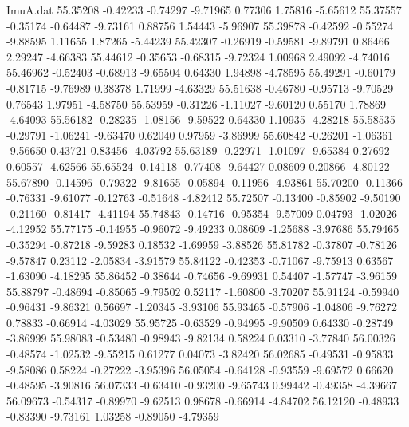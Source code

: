 \begin{filecontents}{ImuA.dat}
  55.35208   -0.42233   -0.74297   -9.71965    0.77306    1.75816   -5.65612
  55.37557   -0.35174   -0.64487   -9.73161    0.88756    1.54443   -5.96907
  55.39878   -0.42592   -0.55274   -9.88595    1.11655    1.87265   -5.44239
  55.42307   -0.26919   -0.59581   -9.89791    0.86466    2.29247   -4.66383
  55.44612   -0.35653   -0.68315   -9.72324    1.00968    2.49092   -4.74016
  55.46962   -0.52403   -0.68913   -9.65504    0.64330    1.94898   -4.78595
  55.49291   -0.60179   -0.81715   -9.76989    0.38378    1.71999   -4.63329
  55.51638   -0.46780   -0.95713   -9.70529    0.76543    1.97951   -4.58750
  55.53959   -0.31226   -1.11027   -9.60120    0.55170    1.78869   -4.64093
  55.56182   -0.28235   -1.08156   -9.59522    0.64330    1.10935   -4.28218
  55.58535   -0.29791   -1.06241   -9.63470    0.62040    0.97959   -3.86999
  55.60842   -0.26201   -1.06361   -9.56650    0.43721    0.83456   -4.03792
  55.63189   -0.22971   -1.01097   -9.65384    0.27692    0.60557   -4.62566
  55.65524   -0.14118   -0.77408   -9.64427    0.08609    0.20866   -4.80122
  55.67890   -0.14596   -0.79322   -9.81655   -0.05894   -0.11956   -4.93861
  55.70200   -0.11366   -0.76331   -9.61077   -0.12763   -0.51648   -4.82412
  55.72507   -0.13400   -0.85902   -9.50190   -0.21160   -0.81417   -4.41194
  55.74843   -0.14716   -0.95354   -9.57009    0.04793   -1.02026   -4.12952
  55.77175   -0.14955   -0.96072   -9.49233    0.08609   -1.25688   -3.97686
  55.79465   -0.35294   -0.87218   -9.59283    0.18532   -1.69959   -3.88526
  55.81782   -0.37807   -0.78126   -9.57847    0.23112   -2.05834   -3.91579
  55.84122   -0.42353   -0.71067   -9.75913    0.63567   -1.63090   -4.18295
  55.86452   -0.38644   -0.74656   -9.69931    0.54407   -1.57747   -3.96159
  55.88797   -0.48694   -0.85065   -9.79502    0.52117   -1.60800   -3.70207
  55.91124   -0.59940   -0.96431   -9.86321    0.56697   -1.20345   -3.93106
  55.93465   -0.57906   -1.04806   -9.76272    0.78833   -0.66914   -4.03029
  55.95725   -0.63529   -0.94995   -9.90509    0.64330   -0.28749   -3.86999
  55.98083   -0.53480   -0.98943   -9.82134    0.58224    0.03310   -3.77840
  56.00326   -0.48574   -1.02532   -9.55215    0.61277    0.04073   -3.82420
  56.02685   -0.49531   -0.95833   -9.58086    0.58224   -0.27222   -3.95396
  56.05054   -0.64128   -0.93559   -9.69572    0.66620   -0.48595   -3.90816
  56.07333   -0.63410   -0.93200   -9.65743    0.99442   -0.49358   -4.39667
  56.09673   -0.54317   -0.89970   -9.62513    0.98678   -0.66914   -4.84702
  56.12120   -0.48933   -0.83390   -9.73161    1.03258   -0.89050   -4.79359

\end{filecontents}
